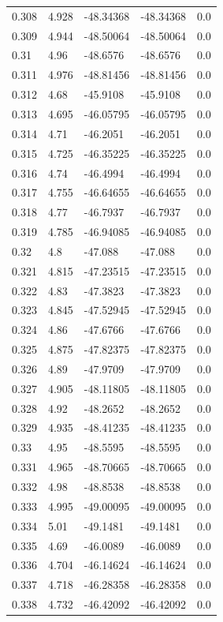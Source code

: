 \begin{tabular}{lllll}
0.308 & 4.928 & -48.34368 & -48.34368 & 0.0 \\
0.309 & 4.944 & -48.50064 & -48.50064 & 0.0 \\
0.31 & 4.96 & -48.6576 & -48.6576 & 0.0 \\
0.311 & 4.976 & -48.81456 & -48.81456 & 0.0 \\
0.312 & 4.68 & -45.9108 & -45.9108 & 0.0 \\
0.313 & 4.695 & -46.05795 & -46.05795 & 0.0 \\
0.314 & 4.71 & -46.2051 & -46.2051 & 0.0 \\
0.315 & 4.725 & -46.35225 & -46.35225 & 0.0 \\
0.316 & 4.74 & -46.4994 & -46.4994 & 0.0 \\
0.317 & 4.755 & -46.64655 & -46.64655 & 0.0 \\
0.318 & 4.77 & -46.7937 & -46.7937 & 0.0 \\
0.319 & 4.785 & -46.94085 & -46.94085 & 0.0 \\
0.32 & 4.8 & -47.088 & -47.088 & 0.0 \\
0.321 & 4.815 & -47.23515 & -47.23515 & 0.0 \\
0.322 & 4.83 & -47.3823 & -47.3823 & 0.0 \\
0.323 & 4.845 & -47.52945 & -47.52945 & 0.0 \\
0.324 & 4.86 & -47.6766 & -47.6766 & 0.0 \\
0.325 & 4.875 & -47.82375 & -47.82375 & 0.0 \\
0.326 & 4.89 & -47.9709 & -47.9709 & 0.0 \\
0.327 & 4.905 & -48.11805 & -48.11805 & 0.0 \\
0.328 & 4.92 & -48.2652 & -48.2652 & 0.0 \\
0.329 & 4.935 & -48.41235 & -48.41235 & 0.0 \\
0.33 & 4.95 & -48.5595 & -48.5595 & 0.0 \\
0.331 & 4.965 & -48.70665 & -48.70665 & 0.0 \\
0.332 & 4.98 & -48.8538 & -48.8538 & 0.0 \\
0.333 & 4.995 & -49.00095 & -49.00095 & 0.0 \\
0.334 & 5.01 & -49.1481 & -49.1481 & 0.0 \\
0.335 & 4.69 & -46.0089 & -46.0089 & 0.0 \\
0.336 & 4.704 & -46.14624 & -46.14624 & 0.0 \\
0.337 & 4.718 & -46.28358 & -46.28358 & 0.0 \\
0.338 & 4.732 & -46.42092 & -46.42092 & 0.0 \\

\end{tabular}

